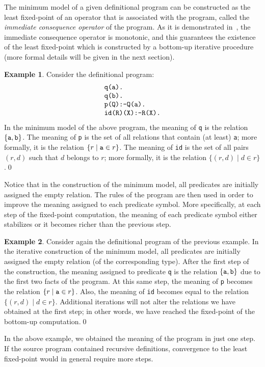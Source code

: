 \documentclass[submission,copyright]{eptcs}
\theoremstyle{definition}
\newtheorem{example}{Example}
\begin{document}
The minimum model of a given definitional program can be constructed as the least fixed-point
of an operator that is associated with the program, called the {\em immediate consequence operator}
of the program. As it is demonstrated in~\cite{Wa91a,KRW05}, the immediate consequence operator
is monotonic, and this guarantees the existence of the least fixed-point which is constructed
by a bottom-up iterative procedure (more formal details will be given in the next section).
\begin{example}\label{example3}
Consider the definitional program:
\[
\begin{array}{l}
\mbox{\tt q(a).}\\
\mbox{\tt q(b).}\\
\mbox{\tt p(Q):-Q(a).}\\
\mbox{\tt id(R)(X):-R(X).}
\end{array}
\]
In the minimum model of the above program, the meaning of {\tt q} is the relation $\{{\tt a},{\tt b}\}$.
The meaning of {\tt p} is the set of all relations that contain (at least) {\tt a}; more formally,
it is the relation $\{r \mid {\tt a} \in r\}$. The meaning of {\tt id} is the set of all pairs $(r,d)$
such that $d$ belongs to $r$; more formally, it is the relation $\{(r,d)\mid d \in r\}$.\qed
\end{example}
Notice that in the construction of the minimum model, all predicates are initially assigned the
empty relation. The rules of the program are then used in order to improve the meaning assigned to
each predicate symbol. More specifically, at each step of the fixed-point computation, the meaning
of each predicate symbol either stabilizes or it becomes richer than the previous step.
\begin{example}\label{example4}
Consider again the definitional program of the previous example. In the iterative construction
of the minimum model, all predicates are initially assigned the empty relation (of the corresponding
type). After the first step of the construction, the meaning assigned to predicate {\tt q} is
the relation $\{{\tt a},{\tt b}\}$ due to the first two facts of the program. At this same step,
the meaning of {\tt p} becomes the relation $\{r \mid {\tt a} \in r\}$. Also, the meaning of
{\tt id} becomes equal to the relation $\{(r,d)\mid d \in r\}$. Additional iterations will not
alter the relations we have obtained at the first step; in other words, we have reached the
fixed-point of the bottom-up computation.\qed
\end{example}
In the above example, we obtained the meaning of the program in just one step. If the source
program contained recursive definitions, convergence to the least fixed-point would in general
require more steps.
\end{document}
